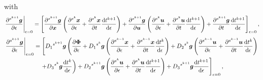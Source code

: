 \documentclass[../DC2017114Bouma.tex]{subfiles}
\begin{document}
with
\begin{align}
\left.\frac{\partial\hspace{0cm}^{s^{k+1}}{\boldsymbol{g}}}{\partial\epsilon}\right|_{\epsilon=0} = \left[\frac{\partial\hspace{0cm}^{s^{k+1}}{\boldsymbol{g}}}{\partial{\boldsymbol{x}}}\left(\frac{\partial\hspace{0cm}^{s^k}{\boldsymbol{x}}}{\partial\epsilon} + \frac{\partial\hspace{0cm}^{s^k}{\boldsymbol{x}}}{\partial t}\frac{\text{d} t^{k+1}}{\text{d}\epsilon}\right) + \frac{\partial\hspace{0cm}^{s^{k+1}}{\boldsymbol{g}}}{\partial{\boldsymbol{u}}}\left(\frac{\partial\hspace{0cm}^{s^k}{\boldsymbol{u}}}{\partial\epsilon} + \frac{\partial\hspace{0cm}^{s^k}{\boldsymbol{u}}}{\partial t}\frac{\text{d} t^{k+1}}{\text{d}\epsilon}\right) + \frac{\partial\hspace{0cm}^{s^{k+1}}{\boldsymbol{g}}}{\partial t}\frac{\text{d} t^{k+1}}{\text{d}\epsilon}\right]_{\epsilon=0},
\end{align}
\begin{multline}
\left.\frac{\partial\hspace{0cm}^{s^{k+1}}{\boldsymbol{g}}}{\partial\epsilon}\right|_{\epsilon=0} = \left[D_1\hspace{0cm}^{s^{k+1}}{\boldsymbol{g}}\left(\frac{\partial \boldsymbol{\Phi}}{\partial\epsilon} + D_1\hspace{0cm}^{s^{k}}{\boldsymbol{g}}\left(\frac{\partial\hspace{0cm}^{s^{k-1}}{\boldsymbol{x}}}{\partial\epsilon} + \frac{\partial\hspace{0cm}^{s^{k-1}}{\boldsymbol{x}}}{\partial t}\frac{\text{d}t^{k}}{\text{d}\epsilon}\right) + D_2\hspace{0cm}^{s^{k}}{\boldsymbol{g}}\left(\frac{\partial\hspace{0cm}^{s^{k-1}}{\boldsymbol{u}}}{\partial\epsilon} + \frac{\partial\hspace{0cm}^{s^{k-1}}{\boldsymbol{u}}}{\partial t}\frac{\text{d} t^{k}}{\text{d}\epsilon}\right)\right.\right.\\\left.\left. + D_3\hspace{0cm}^{s^{k}}{\boldsymbol{g}}\frac{\text{d} t^k}{\text{d} \epsilon} \right) + D_2\hspace{0cm}^{s^{k+1}}{\boldsymbol{g}}\left(\frac{\partial\hspace{0cm}^{s^k}{\boldsymbol{u}}}{\partial\epsilon} + \frac{\partial\hspace{0cm}^{s^k}{\boldsymbol{u}}}{\partial t}\frac{\text{d} t^{k+1}}{\text{d}\epsilon}\right) + D_3\hspace{0cm}^{s^{k+1}}{\boldsymbol{g}}\frac{\text{d} t^{k+1}}{\text{d}\epsilon}\right]_{\epsilon=0},
\end{multline}

\end{document}
